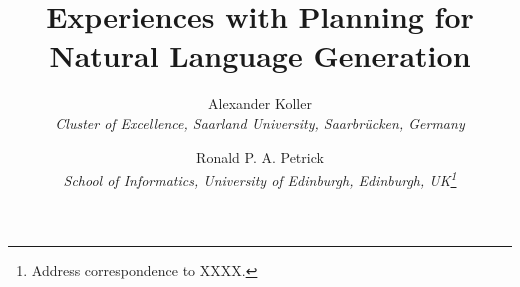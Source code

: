 \documentclass[useAMS,usenatbib]{coin}
\title{Experiences with Planning for Natural Language Generation}
\author{{\sc Alexander Koller}\\
        {\it Cluster of Excellence, Saarland University, Saarbr\"ucken, Germany}\\ 
		\and
        {\sc Ronald P. A. Petrick}\\
        {\it School of Informatics, University of Edinburgh,
          Edinburgh, UK\thanks{Address correspondence to XXXX.}}
}
\date{}
\begin{document}


\maketitle












\pagebreak
\listoffigures
\end{document}
